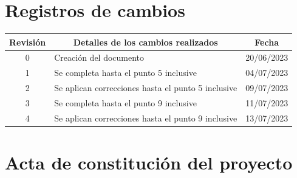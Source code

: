 \documentclass[
11pt, %
]{charter}
\begin{document}
\maketitle
\thispagestyle{empty}
\pagebreak


\thispagestyle{empty}
{\setlength{\parskip}{0pt}
\tableofcontents{}
}
\pagebreak


\section*{Registros de cambios}
\label{sec:registro}


\begin{table}[ht]
\label{tab:registro}
\centering
\begin{tabularx}{\linewidth}{@{}|c|X|c|@{}}
\hline
\rowcolor[HTML]{C0C0C0} 
Revisión & \multicolumn{1}{c|}{\cellcolor[HTML]{C0C0C0}Detalles de los cambios realizados} & Fecha      \\ \hline
0      & Creación del documento                                 & 20/06/2023 \\ \hline
1      & Se completa hasta el punto 5 inclusive                 & 04/07/2023 \\ \hline
2          & Se aplican correcciones hasta el punto 5 inclusive                  & 09/07/2023 \\ \hline
3          & Se completa hasta el punto 9 inclusive                 & 11/07/2023 \\ \hline
4          & Se aplican correcciones hasta el punto 9 inclusive                & 13/07/2023 \\ \hline

\end{tabularx}
\end{table}

\pagebreak



\section*{Acta de constitución del proyecto}
\label{sec:acta}
\end{document}
